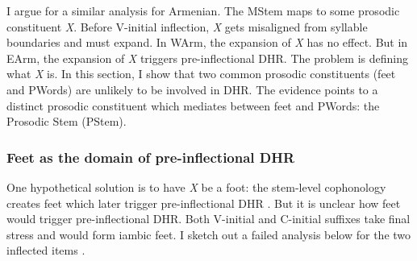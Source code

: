 I argue for a similar analysis for Armenian. The MStem maps to some prosodic constituent \textit{X}. Before V-initial inflection, \textit{X} gets misaligned from syllable boundaries and must expand. In WArm, the expansion of \textit{X} has no effect. But in EArm, the expansion of \textit{X} triggers pre-inflectional DHR. The problem is defining what \textit{X} is. In this section, I show that two common prosodic constituents (feet and PWords) are unlikely to be involved in DHR. The evidence points to a distinct prosodic constituent which mediates between feet and PWords: the Prosodic Stem (PStem).



\subsubsection{Feet as the domain of pre-inflectional DHR}\label{nlttPapersection: reduction: destressed reduction EA: pword and feet: feet}

One hypothetical solution is to have \textit{X} be a foot: the stem-level cophonology creates feet which later trigger pre-inflectional DHR \citep[cf.][]{Anttila-2006-VariationOpacityFinnish}. But it is unclear how feet would trigger pre-inflectional DHR. Both V-initial and C-initial suffixes take final stress and would form iambic feet. I sketch out a failed analysis below for the two inflected items \textit{}.









